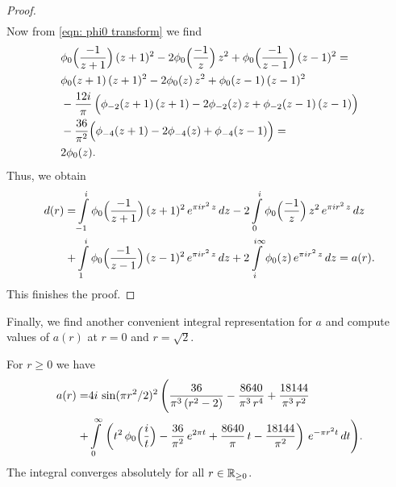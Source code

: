 \begin{proof}
\begin{align}
\end{align}
Now from \eqref{eqn: phi0 transform} we find
\begin{align}&\phi_0\Big(\frac{-1}{z+1}\Big)\,(z+1)^2-2\phi_0\Big(\frac{-1}{z}\Big)\,z^2+
\phi_0\Big(\frac{-1}{z-1}\Big)\,(z-1)^2=\notag\\
&\phi_0(z+1)\,(z+1)^2-2\phi_0(z)\,z^2+\phi_0(z-1)\,(z-1)^2\notag\\
&-\frac{12i}{\pi}\,\Big(\phi_{-2}(z+1)\,(z+1)-2\phi_{-2}(z)\,z+\phi_{-2}(z-1)\,(z-1)\Big)\notag\\
&-\frac{36}{\pi^2}\Big(\phi_{-4}(z+1)-2\phi_{-4}(z)+\phi_{-4}(z-1)\Big)=\notag\\
&2\phi_0(z).
  \end{align}
  Thus, we obtain
  \begin{align}
  d(r)=&\int\limits_{-1}^{i}\phi_0\Big(\frac{-1}{z+1}\Big)\,(z+1)^2\,e^{\pi i r^2 \,z}\,dz
  -2\int\limits_{0}^{i}\phi_0\Big(\frac{-1}{z}\Big)\,z^2\,e^{\pi i r^2 \,z}\,dz\notag\\
  +&\int\limits_{1}^{i}\phi_0\Big(\frac{-1}{z-1}\Big)\,(z-1)^2\,e^{\pi i r^2 \,z}\,dz
  +2\int\limits_{i}^{i\infty}\phi_0(z)\,e^{\pi i r^2 \,z}\,dz=a(r).\notag
\end{align}
This finishes the proof.
\end{proof}
Finally, we find another convenient integral representation for $a$ and compute values of $a(r)$ at $r=0$ and $r=\sqrt{2}$.
\begin{proposition}\label{prop: a another integral}
For $r\geq0$ we have
\begin{align}\label{eqn: a another integral}a(r)=&4i\,\sin(\pi r^2/2)^2\,\Bigg(\frac{36}{\pi^3\,(r^2-2)}-\frac{8640}{\pi^3\,r^4}+\frac{18144}{\pi^3\,r^2}\\ +&\int\limits_0^\infty\,\left(t^2\,\phi_0\Big(\frac{i}{t}\Big)-\frac{36}{\pi^2}\,e^{2\pi t}+\frac{8640}{\pi}\,t-\frac{18144}{\pi^2}\right)\,e^{-\pi r^2 t}\,dt \Bigg) .\notag\end{align}
The integral converges absolutely for all $r\in\mathbb{R}_{\geq 0}$.
\end{proposition}
